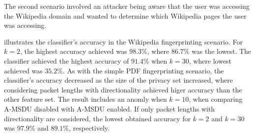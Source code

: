 \begin{table}
    \caption{Classifier's accuracy in the Wikipedia fingerprinting scenario.}
    \centering
    \label{fig:accuracy_WFS2}
\end{table}

The second scenario involved an attacker being aware that the user was accessing the Wikipedia domain and wanted to determine which Wikipedia pages the user was accessing.

 illustrates the classifier's accuracy in the Wikipedia fingerprinting scenario. For $k=2$, the highest accuracy achieved was $98.3\%$, where $86.7\%$ was the lowest. The classifier achieved the highest accuracy of $91.4\%$ when $k=30$, where lowest achieved was $35.2\%$. As with the simple PDF fingerprinting scenario, the classifier's accuracy decreased as the size of the privacy set increased, where considering packet lengths with directionality achieved higer accuracy than the other feature set. The result includes an anomly when $k=10$, when comparing A-MSDU disabled with A-MSDU enabled. If only packet lengths with directionality are considered, the lowest obtained accuracy for $k=2$ and $k=30$ was $97.9\%$ and $89.1\%$, respectively.

